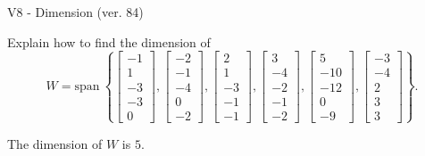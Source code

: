 \begin{exercise}
  \begin{exerciseTitle}V8 - Dimension (ver. 84)\end{exerciseTitle}
  \begin{exerciseStatement}
    Explain how to find the dimension of 
\[W=\mathrm{span}\ \left\{\left[\begin{array}{r}
-1 \\
1 \\
-3 \\
-3 \\
0
\end{array}\right] , \left[\begin{array}{r}
-2 \\
-1 \\
-4 \\
0 \\
-2
\end{array}\right] , \left[\begin{array}{r}
2 \\
1 \\
-3 \\
-1 \\
-1
\end{array}\right] , \left[\begin{array}{r}
3 \\
-4 \\
-2 \\
-1 \\
-2
\end{array}\right] , \left[\begin{array}{r}
5 \\
-10 \\
-12 \\
0 \\
-9
\end{array}\right] , \left[\begin{array}{r}
-3 \\
-4 \\
2 \\
3 \\
3
\end{array}\right]\right\}.\]



  \end{exerciseStatement}
  \begin{exerciseAnswer}
   The dimension of \(W\) is  \(5\).
  


  \end{exerciseAnswer}
\end{exercise}